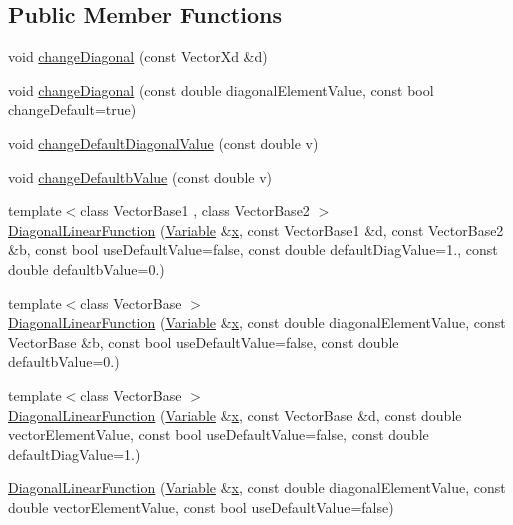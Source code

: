 \subsection*{Public Member Functions}
\begin{DoxyCompactItemize}
\item 
void \hyperlink{classocra_1_1DiagonalLinearFunction_a0ef4d3d73af4c8e884d799024887d1ae}{change\+Diagonal} (const Vector\+Xd \&d)
\item 
void \hyperlink{classocra_1_1DiagonalLinearFunction_ac17d245b02f9388fea8bf1a724ec0106}{change\+Diagonal} (const double diagonal\+Element\+Value, const bool change\+Default=true)
\item 
void \hyperlink{classocra_1_1DiagonalLinearFunction_a8912906e227dc8ebce7339eceb09e72e}{change\+Default\+Diagonal\+Value} (const double v)
\item 
void \hyperlink{classocra_1_1DiagonalLinearFunction_a728b7f4b453ad06f385601b736290979}{change\+Defaultb\+Value} (const double v)
\end{DoxyCompactItemize}
{\bf }\par
\begin{DoxyCompactItemize}
\item 
{\footnotesize template$<$class Vector\+Base1 , class Vector\+Base2 $>$ }\\\hyperlink{classocra_1_1DiagonalLinearFunction_ab96ebb7bcf93104dad806f1ac47a2e8f}{Diagonal\+Linear\+Function} (\hyperlink{classocra_1_1Variable}{Variable} \&\hyperlink{classocra_1_1Function_a28825886d1f149c87b112ec2ec1dd486}{x}, const Vector\+Base1 \&d, const Vector\+Base2 \&b, const bool use\+Default\+Value=false, const double default\+Diag\+Value=1., const double defaultb\+Value=0.)
\item 
{\footnotesize template$<$class Vector\+Base $>$ }\\\hyperlink{classocra_1_1DiagonalLinearFunction_af144cecdab815f972418891a35f8ee2c}{Diagonal\+Linear\+Function} (\hyperlink{classocra_1_1Variable}{Variable} \&\hyperlink{classocra_1_1Function_a28825886d1f149c87b112ec2ec1dd486}{x}, const double diagonal\+Element\+Value, const Vector\+Base \&b, const bool use\+Default\+Value=false, const double defaultb\+Value=0.)
\item 
{\footnotesize template$<$class Vector\+Base $>$ }\\\hyperlink{classocra_1_1DiagonalLinearFunction_a4cd597044d6af815e1c6cec976958c54}{Diagonal\+Linear\+Function} (\hyperlink{classocra_1_1Variable}{Variable} \&\hyperlink{classocra_1_1Function_a28825886d1f149c87b112ec2ec1dd486}{x}, const Vector\+Base \&d, const double vector\+Element\+Value, const bool use\+Default\+Value=false, const double default\+Diag\+Value=1.)
\item 
\hyperlink{classocra_1_1DiagonalLinearFunction_a363e6ca5190cedaf2bbce516d27127f9}{Diagonal\+Linear\+Function} (\hyperlink{classocra_1_1Variable}{Variable} \&\hyperlink{classocra_1_1Function_a28825886d1f149c87b112ec2ec1dd486}{x}, const double diagonal\+Element\+Value, const double vector\+Element\+Value, const bool use\+Default\+Value=false)
\end{DoxyCompactItemize}

